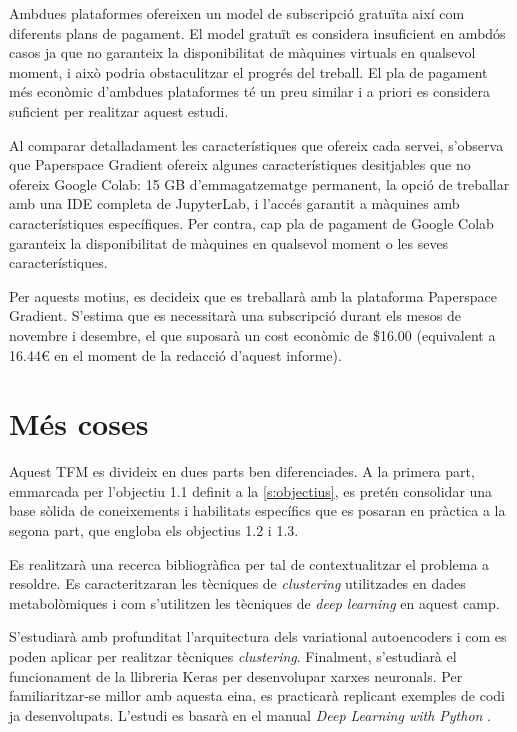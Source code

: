 \documentclass[CAT,BIB]{TFUOC}%
\begin{document}
            Ambdues plataformes ofereixen un model de subscripció gratuïta així com diferents plans de pagament. El model gratuït es considera insuficient en ambdós casos ja que no garanteix la disponibilitat de màquines virtuals en qualsevol moment, i això podria obstaculitzar el progrés del treball. El pla de pagament més econòmic d'ambdues plataformes té un preu similar i a priori es considera suficient per realitzar aquest estudi.

            Al comparar detalladament les característiques que ofereix cada servei, s'observa que Paperspace Gradient ofereix algunes característiques desitjables que no ofereix Google Colab: 15 GB d'emmagatzematge permanent, la opció de treballar amb una IDE completa de JupyterLab, i l'accés garantit a màquines amb característiques específiques. Per contra, cap pla de pagament de Google Colab garanteix la disponibilitat de màquines en qualsevol moment o les seves característiques.

            Per aquests motius, es decideix que es treballarà amb la plataforma Paperspace Gradient. S'estima que es necessitarà una subscripció durant els mesos de novembre i desembre, el que suposarà un cost econòmic de \$16.00 (equivalent a 16.44€ en el moment de la redacció d'aquest informe).

    \section{Més coses}
    \label{s:mes}

    Aquest TFM es divideix en dues parts ben diferenciades. A la primera part, emmarcada per l'objectiu 1.1 definit a la \cref{s:objectius}, es pretén consolidar una base sòlida de coneixements i habilitats específics que es posaran en pràctica a la segona part, que engloba els objectius 1.2 i 1.3.

    Es realitzarà una recerca bibliogràfica per tal de contextualitzar el problema a resoldre. Es caracteritzaran les tècniques de \textit{clustering} utilitzades en dades metabolòmiques i com s'utilitzen les tècniques de \textit{deep learning} en aquest camp.

    S'estudiarà amb profunditat l'arquitectura dels variational autoencoders i com es poden aplicar per realitzar tècniques \textit{clustering}. Finalment, s'estudiarà el funcionament de la llibreria Keras per desenvolupar xarxes neuronals. Per familiaritzar-se millor amb aquesta eina, es practicarà replicant exemples de codi ja desenvolupats. L'estudi es basarà en el manual \textit{Deep Learning with Python} \citep{Ketkar2021}.
\end{document}
